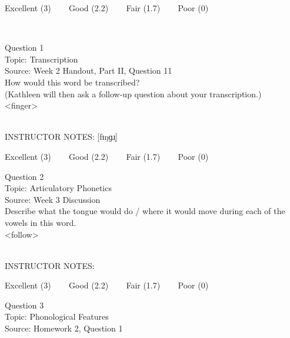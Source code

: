 \documentclass[12pt]{article}
\begin{document}
\vfill
Excellent (3) ~~~ Good (2.2) ~~~ Fair (1.7) ~~~ Poor (0)
\newpage

\begin{center}
\textbf{{\color{red}{\HUGE END OF EXAM}}}\\

\end{center}
\newpage

\begin{center}
\textbf{{\color{blue}{\HUGE START OF EXAM\\}}}

\textbf{{\color{blue}{\HUGE Student ID: 33428\\}}}

\textbf{{\color{blue}{\HUGE \\}}}

\end{center}
\newpage

{\large Question 1}\\

Topic: Transcription\\
Source: Week 2 Handout, Part II, Question 11\\

How would this word be transcribed?\\ (Kathleen will then ask a follow-up question about your transcription.)\\

<finger>


~\\
INSTRUCTOR NOTES: [fɪŋɡɹ̩]


\vfill
Excellent (3) ~~~ Good (2.2) ~~~ Fair (1.7) ~~~ Poor (0)
\newpage

{\large Question 2}\\

Topic: Articulatory Phonetics\\
Source: Week 3 Discussion\\

Describe what the tongue would do / where it would move during each of the vowels in this word.\\

<follow>


~\\
INSTRUCTOR NOTES: 


\vfill
Excellent (3) ~~~ Good (2.2) ~~~ Fair (1.7) ~~~ Poor (0)
\newpage

{\large Question 3}\\

Topic: Phonological Features\\
Source: Homework 2, Question 1\\
\end{document}
